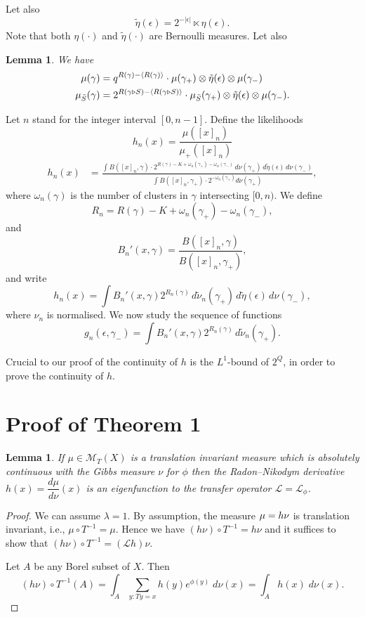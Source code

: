 \documentclass[11pt, a4paper]{amsart}
\newtheorem{lem}[thm]{Lemma}
\theoremstyle{definition}
\theoremstyle{remark}
\renewcommand{\d}{\,d}
\providecommand{\CM}{\mathscr{M}}
\providecommand{\mscr}{\mathscr}
\providecommand{\e}{\epsilon}
\providecommand{\g}{\gamma}
\def\X{X}
\def\T{T}
\begin{document}
Let also
$$ \tilde \eta(\epsilon)= 2^{-|\epsilon|} \ltimes \eta (\epsilon). $$
Note that both $\eta(\cdot)$ and $\tilde\eta (\cdot)$ are Bernoulli measures. Let also
\begin{lem}\label{lem:distributive}
  We have
\begin{align}
  \mu(\g) &= q^{R(\g) - \cc{R(\g)}} \cdot \mu(\g_+) \otimes \tilde\eta(\e) \otimes \mu(\g_-) \\
  \mu_{\bar S}(\g) &= 2^{R( \g \triangleright S) - \cc{R(\g\triangleright S)}} \cdot \mu_{\bar S}(\g_+) \otimes \tilde \eta(\e) \otimes \mu(\g_-).
\end{align}
\end{lem}

\def\sn{{n}}

Let $\sn$ stand for the integer interval $[0,n-1]$. Define the likelihoods
\begin{equation*}
  h_n(x) = \frac{\mu([x]_\sn)}{\mu_+([x]_\sn)}
\end{equation*}
\begin{align}
  h_n(x) &= 
  \frac{\int B([x]_n, \g) \cdot 2^{R(\g)-K+\omega_n(\g_+)-\omega_n(\g_-)}
  \d\nu(\g_+)\d \tilde \eta(\e)\d\nu(\g_-)}
  {\int B([x]_n,\g_+) \cdot 2^{-\omega_n(\g_+)} d\nu(\g_+)},
\end{align}
where 
$\omega_n(\g)$ is the number of clusters in $\g$ intersecting $[0,n)$. We define 
$$R_n=R(\g)-K+\omega_n(\g_+)-\omega_n(\g_-),$$ and 
$$B_n'(x,\g)=\frac{B([x]_n, \g)}{B([x]_n,\g_+)},$$
and write
$$ h_n(x) = \int B_n'(x,\g) 2^{R_n(\g)}\d\tilde \nu_n(\g_+)\d \tilde \eta(\e)\d\nu(\g_-),$$
where $\nu_n$ is normalised. We now study the sequence of functions 
$$g_n(\epsilon, \g_-)=\int B_n'(x,\g) 2^{R_n(\g)}\d\tilde \nu_n(\g_+).$$

Crucial to our proof of the continuity of $h$ is the $L^1$-bound of $2^Q$, in order to prove the continuity of $h$.

\section{Proof of Theorem 1}\noindent

\begin{lem}
  If $\mu\in\CM_\T(\X)$ is a translation invariant measure which is absolutely
  continuous with the Gibbs measure $\nu$ for $\phi$ then the Radon--Nikodym
  derivative $h(x)=\dfrac{d\mu}{d\nu}(x)$ is an eigenfunction to the transfer
  operator $\mscr L =\mscr L_\phi$.
\end{lem}
\begin{proof}
  We can assume $\lambda=1$. By assumption, the measure $\mu= h \nu$ is translation
  invariant, i.e., $\mu\circ T^{-1}=\mu$. Hence we have $(h\nu)\circ T^{-1}=h\nu$ and it
  suffices to show that $(h\nu) \circ T^{-1}=({\mathcal L}h)\nu$.

  Let $A$ be any Borel subset of $\X$. Then
  $$(h\nu)\circ T^{-1} (A)=\int_A \sum_{y: Ty=x} h(y)e^{\phi(y)}\; d\nu(x)=\int_A h(x)\; d\nu(x).$$
\end{proof}
\end{document}
